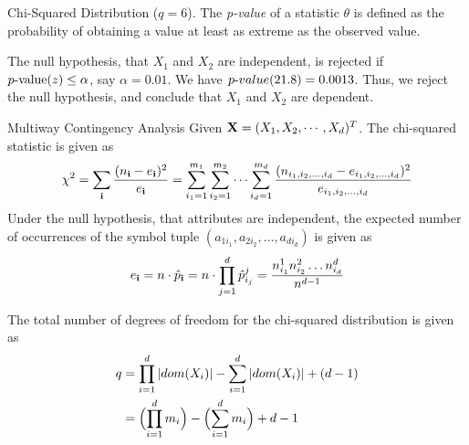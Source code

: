 \begin{frame}{Chi-Squared Distribution ($\textit{q}=6$).}
  \small
  The {\em p-value} of a statistic $\theta$ is defined as
the probability of
obtaining a value at least as extreme as the observed value.

The null hypothesis, that $X_1$ and $X_2$ are independent, is rejected
if $p\hbox{-}\textrm{value}(z) \le \alpha$, say $\alpha=0.01$.
We have ${p\text{-}value}(21.8) = 0.0013$. Thus, we reject the null hypothesis,
and conclude that $X_1$ and $X_2$ are dependent.

\bigskip\bigskip
\centerline{
\normalsize
  }
\end{frame}


\begin{frame}{Multiway Contingency Analysis}
  Given $\mathbf{X} = (X_1, X_2, \cdots, X_d)^T$.
The chi-squared statistic is given as
\begin{align*}
  \chi^2 = \sum_{\mathbf{i}} \frac{(n_{\mathbf{i}} - e_{\mathbf{i}})^2}{e_{\mathbf{i}}} =
  \sum_{i_1=1}^{m_1} \sum_{i_2=1}^{m_2} \cdots \sum_{i_d=1}^{m_d}
  {(n_{i_1,i_2,\ldots, i_d} - e_{i_1,i_2,\ldots,i_d} )^2 \over
  e_{i_1,i_2,\ldots,i_d}}
\end{align*}
Under the null hypothesis, that attributes are independent, 
the expected number of occurrences
of the symbol tuple $(a_{1i_1}, a_{2i_2}, \dots, a_{d i_d})$
is given as
\begin{align*}
    e_{\mathbf{i}} = n \cdot \hat{p}_{\mathbf{i}} =
    n \cdot \prod_{j=1}^d \hat{p}^j_{i_{j}} =
    {n^1_{i_1} n^2_{i_2} \dots n^d_{i_d} \over n^{d-1}}
\end{align*}

The total number of degrees of freedom for the chi-squared distribution 
is given as
\begin{align*}
    q & = \prod_{i=1}^d |dom(X_{i})| - \sum_{i=1}^d
    |dom(X_{i})| + (d-1) \notag\\
    & = \Bigl(\prod_{i=1}^d m_i\Bigr) -
    \Bigl(\sum_{i=1}^d m_i\Bigr) + d-1
\end{align*}
\end{frame}



